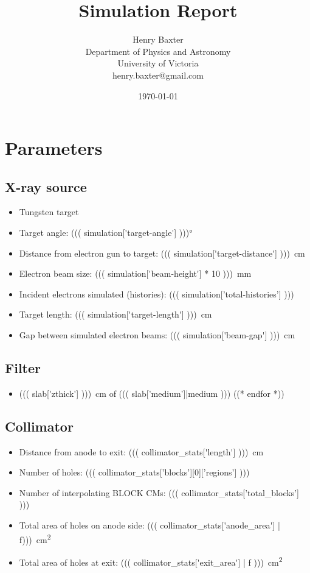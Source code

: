 \documentclass[12pt]{article}
\title{Simulation Report}
\author{
        Henry Baxter \\
                Department of Physics and Astronomy\\
        University of Victoria\\
        henry.baxter@gmail.com
}
\date{\today}
\begin{document}
\maketitle

\tableofcontents

\section{Parameters}

\subsection{X-ray source}
\begin{itemize}
	\item Tungsten target
	\item Target angle: \ang{((( simulation['target-angle'] )))}
	\item Distance from electron gun to target: \SI{((( simulation['target-distance'] )))}{\cm}
	\item Electron beam size: \SI{((( simulation['beam-height'] * 10 )))}{\mm}
	\item Incident electrons simulated (histories): ((( simulation['total-histories'] )))
	\item Target length: \SI{((( simulation['target-length'] )))}{\cm}
	\item Gap between simulated electron beams: \SI{((( simulation['beam-gap'] )))}{\cm}
\end{itemize}

\subsection{Filter}
\begin{itemize}
	((* for slab in templates['filter']['cms'][0]['slabs'] *))
	\item \SI{((( slab['zthick'] )))}{\cm} of ((( slab['medium']|medium )))
	((* endfor *))
\end{itemize}

\subsection{Collimator}
\begin{itemize}
	\item Distance from anode to exit: \SI{((( collimator_stats['length'] )))}{\cm}
	\item Number of holes: ((( collimator_stats['blocks'][0]['regions'] )))
	\item Number of interpolating BLOCK CMs: ((( collimator_stats['total_blocks'] )))
	\item Total area of holes on anode side: \SI{((( collimator_stats['anode_area'] | f)))}{\cm\squared}
	\item Total area of holes at exit: \SI{((( collimator_stats['exit_area'] | f )))}{\cm\squared}
\end{itemize}
\end{document}
